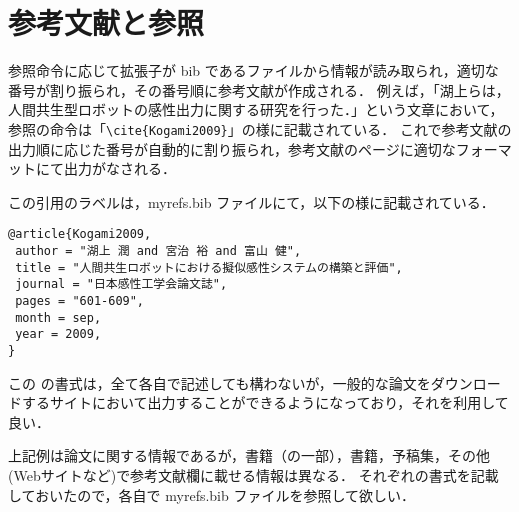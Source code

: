 \section{参考文献と参照}
参照命令に応じて拡張子が bib であるファイルから情報が読み取られ，適切な番号が割り振られ，その番号順に参考文献が作成される．
例えば，「湖上ら\cite{Kogami2009}は，人間共生型ロボットの感性出力に関する研究を行った．」という文章において，参照の命令は「\verb+\cite{Kogami2009}+」の様に記載されている．
これで参考文献の出力順に応じた番号が自動的に割り振られ，参考文献のページに適切なフォーマットにて出力がなされる\cite{miyaji2010}．

この引用のラベルは，myrefs.bib ファイルにて，以下の様に記載されている．
\begin{breakbox}
{\small
\begin{verbatim}
@article{Kogami2009,
 author = "湖上 潤 and 宮治 裕 and 富山 健",
 title = "人間共生ロボットにおける擬似感性システムの構築と評価",
 journal = "日本感性工学会論文誌",
 pages = "601-609",
 month = sep,
 year = 2009,
}
\end{verbatim}
}
\end{breakbox}
この \BibTeX の書式は，全て各自で記述しても構わないが，一般的な論文をダウンロードするサイトにおいて出力することができるようになっており，それを利用して良い．

上記例は論文に関する情報であるが，書籍（の一部）\cite{WelfareJapan}，書籍\cite{Nakata2010}，予稿集\cite{Miyaji2003ROMAN}，その他(Webサイトなど)\cite{HTUlatex}で参考文献欄に載せる情報は異なる．
それぞれの書式を記載しておいたので，各自で myrefs.bib ファイルを参照して欲しい．

